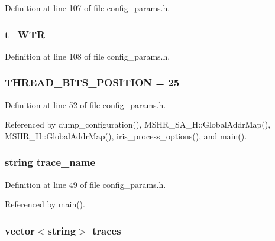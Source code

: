 Definition at line 107 of file config\_\-params.h.
\subsubsection[{t\_\-WTR}]{ {\bf t\_\-WTR}}\label{config__params_8h_344b9b38599995882828432f63575e65}




Definition at line 108 of file config\_\-params.h.
\subsubsection[{THREAD\_\-BITS\_\-POSITION}]{ {\bf THREAD\_\-BITS\_\-POSITION} = 25}\label{config__params_8h_08515d4ff3a55a88340b5e2abfe7584f}




Definition at line 52 of file config\_\-params.h.

Referenced by dump\_\-configuration(), MSHR\_\-SA\_\-H::GlobalAddrMap(), MSHR\_\-H::GlobalAddrMap(), iris\_\-process\_\-options(), and main().
\subsubsection[{trace\_\-name}]{\setlength{\rightskip}{0pt plus 5cm}string {\bf trace\_\-name}}\label{config__params_8h_f32dbbf0cf427703305dd8eaf4ab6319}




Definition at line 49 of file config\_\-params.h.

Referenced by main().
\subsubsection[{traces}]{\setlength{\rightskip}{0pt plus 5cm}vector$<$string$>$ {\bf traces}}\label{config__params_8h_4d84e80916b5e7231268c0e679e4eaf9}




